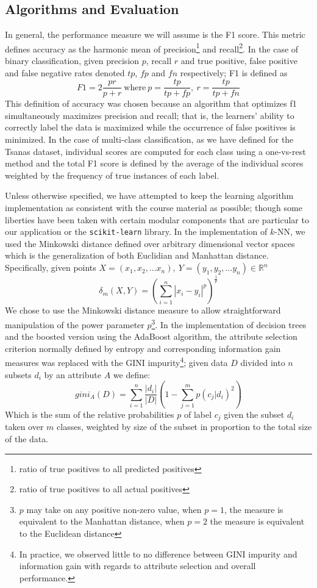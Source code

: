 \documentclass[12pt]{article}
\begin{document}
\subsection{Algorithms and Evaluation}
In general, the performance measure we will assume is the F1 score. This metric defines accuracy as the harmonic mean of precision\footnote{ratio of true positives to all predicted positives} and recall\footnote{ratio of true positives to all actual positives}. In the case of binary classification, given precision $p$, recall $r$ and true positive, false positive and false negative rates denoted $tp$, $fp$ and $fn$ respectively; F1 is defined as
\begin{equation}
F1 = 2\frac{pr}{p+r} \ \textrm{where} \ p = \frac{tp}{tp + fp},\ r = \frac{tp}{tp + fn}
\end{equation}
This definition of accuracy was chosen because an algorithm that optimizes f1 simultaneously maximizes precision and recall; that is, the learners' ability to correctly label the data is maximized while the occurrence of false positives is minimized. In the case of multi-class classification, as we have defined for the Tsanas dataset, individual scores are computed for each class using a one-vs-rest method and the total F1 score is defined by the average of the individual scores weighted by the frequency of true instances of each label.

Unless otherwise specified, we have attempted to keep the learning algorithm implementation as consistent with the course material as possible; though some liberties have been taken with certain modular components that are particular to our application or the \texttt{scikit-learn} library. In the implementation of $k$-NN, we used the Minkowski distance defined over arbitrary dimensional vector spaces which is the generalization of both Euclidian and Manhattan distance. Specifically, given points $X = (x_1, x_2, ... x_n), \ Y = (y_1, y_2, ... y_n) \in \mathbb{R}^n$
\begin{equation}
\delta_m(X,Y) = (\sum_{i=1}^n|x_i-y_i|^p)^{\frac{1}{p}}
\end{equation}
We chose to use the Minkowski distance measure to allow straightforward manipulation of the power parameter $p$\footnote{$p$ may take on any positive non-zero value, when $p=1$, the measure is equivalent to the Manhattan distance, when $p=2$ the measure is equivalent to the Euclidean distance}. In the implementation of decision trees and the boosted version using the AdaBoost algorithm, the attribute selection criterion normally defined by entropy and corresponding information gain measures was replaced with the GINI impurity\footnote{In practice, we observed little to no difference between GINI impurity and information gain with regards to attribute selection and overall performance.}; given data $D$ divided into $n$ subsets $d_i$ by an attribute $A$ we define:
\begin{equation}
gini_A(D) = \sum_{i=1}^n\frac{|d_i|}{|D|}(1-\sum_{j=1}^m p(c_j|d_i)^2)
\end{equation}
Which is the sum of the relative probabilities $p$ of label $c_j$ given the subset $d_i$ taken over $m$ classes, weighted by size of the subset in proportion to the total size of the data.
\end{document}
